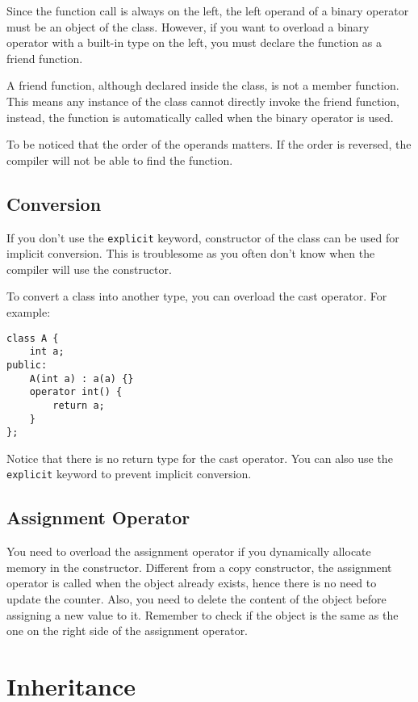 \documentclass[a4paper,12pt]{article}
\begin{document}
Since the function call is always on the left, the left operand of a binary operator must be an object of the class.
However, if you want to overload a binary operator with a built-in type on the left, you must declare the function as a friend function.

A friend function, although declared inside the class, is not a member function.
This means any instance of the class cannot directly invoke the friend function, instead, the function is automatically called when the binary operator is used.

To be noticed that the order of the operands matters.
If the order is reversed, the compiler will not be able to find the function.

\subsection{Conversion}

If you don't use the \texttt{explicit} keyword, constructor of the class can be used for implicit conversion.
This is troublesome as you often don't know when the compiler will use the constructor.

To convert a class into another type, you can overload the cast operator.
For example:
\begin{verbatim}
class A {
    int a;
public:
    A(int a) : a(a) {}
    operator int() {
        return a;
    }
};
\end{verbatim}

Notice that there is no return type for the cast operator.
You can also use the \texttt{explicit} keyword to prevent implicit conversion.

\subsection{Assignment Operator}

You need to overload the assignment operator if you dynamically allocate memory in the constructor.
Different from a copy constructor, the assignment operator is called when the object already exists, hence there is no need to update the counter.
Also, you need to delete the content of the object before assigning a new value to it.
Remember to check if the object is the same as the one on the right side of the assignment operator.

\section{Inheritance}
\end{document}
